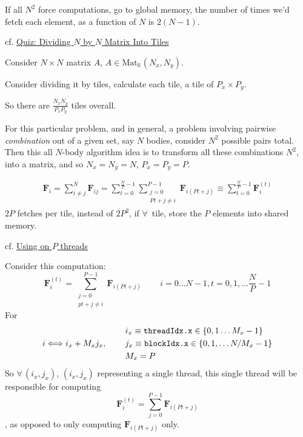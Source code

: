 \documentclass[10pt]{amsart}
\begin{document}
\begin{multicols*}{2}
If all $N^2$ force computations, go to global memory, the number of times we'd fetch each element, as a function of $N$ is $\boxed{ 2(N-1) }$.  

cf. \href{https://classroom.udacity.com/courses/cs344/lessons/116611037/concepts/1198442190923#}{Quiz: Dividing $N$ by $N$ Matrix Into Tiles}  

Consider $N\times N$ matrix $A$, $A\in \text{Mat}_{\mathbb{K}}(N_x,N_y)$.

Consider dividing it by tiles, calculate each tile, a tile of $P_x \times P_y$.

So there are $\frac{N_xN_y}{P_xP_y}$ tiles overall.

For this particular problem, and in general, a problem involving pairwise \emph{combination} out of a given set, say $N$ bodies, consider $N^2$ possible pairs total.  Then this all $N$-body algorithm idea is to transform all these combinations $N^2$, into a matrix, and so $N_x=N_y=N$, $P_x=P_y=P$.

\begin{equation}
\begin{gathered}
  \mathbf{F}_i = \sum_{i\neq j}^N \mathbf{F}_{ij} = \sum_{t=0}^{\frac{N}{P}-1} \sum_{ \substack{ j=0 \\ Pt+j\neq i  }  }^{P-1} \mathbf{F}_{i(Pt+j)} \equiv \sum_{t=0}^{\frac{N}{P}-1} \mathbf{F}_i^{(t)}
  \end{gathered}
\end{equation}
$2P$ fetches per tile, instead of $2P^2$, if $\forall \, $ tile, store the $P$ elements into shared memory.

cf. \href{https://classroom.udacity.com/courses/cs344/lessons/116611037/concepts/1168851160923}{Using on $P$ threads}

Consider this computation:
\begin{equation}
  \mathbf{F}_i^{(t)} = \sum_{ \substack{ j=0 \\ pt+j\neq i } }^{P-1} \mathbf{F}_{i(Pt+j)} \qquad \, i=0\dots N-1, t=0,1,\dots \frac{N}{P}-1
\end{equation}
For
\[
i \Longleftrightarrow i_x + M_x j_x, \qquad \, \begin{aligned}
  & i_x \equiv \verb|threadIdx.x| \in \lbrace 0 ,1 \dots M_x- 1 \rbrace \\
  & j_x \equiv \verb|blockIdx.x| \in \lbrace 0 ,1 ,\dots N/M_x-1 \rbrace \\
  & M_x = P \end{aligned}
\]
So $\forall \, (i_x,j_x)$, $(i_x,j_x)$ representing a single thread, this single thread will be responsible for computing
\[
\mathbf{F}_i^{(t)} =\sum_{j=0}^{P-1} \mathbf{F}_{i(Pt+j)}
\]
, as opposed to only computing $\mathbf{F}_{i(Pt+j)}$ only.  



\end{multicols*}
\end{document}
